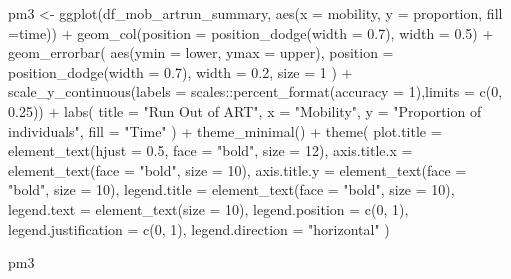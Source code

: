 \documentclass[
  letterpaper,
  DIV=11,
  numbers=noendperiod]{scrartcl}
\newenvironment{Shaded}{\begin{snugshade}}{\end{snugshade}}
\newcommand{\AttributeTok}[1]{\textcolor[rgb]{0.40,0.45,0.13}{#1}}
\newcommand{\DecValTok}[1]{\textcolor[rgb]{0.68,0.00,0.00}{#1}}
\newcommand{\FloatTok}[1]{\textcolor[rgb]{0.68,0.00,0.00}{#1}}
\newcommand{\FunctionTok}[1]{\textcolor[rgb]{0.28,0.35,0.67}{#1}}
\newcommand{\NormalTok}[1]{\textcolor[rgb]{0.00,0.23,0.31}{#1}}
\newcommand{\OtherTok}[1]{\textcolor[rgb]{0.00,0.23,0.31}{#1}}
\newcommand{\SpecialCharTok}[1]{\textcolor[rgb]{0.37,0.37,0.37}{#1}}
\newcommand{\StringTok}[1]{\textcolor[rgb]{0.13,0.47,0.30}{#1}}
\begin{document}
\begin{Shaded}
\begin{Highlighting}[]
\NormalTok{pm3 }\OtherTok{\textless{}{-}} \FunctionTok{ggplot}\NormalTok{(df\_mob\_artrun\_summary, }\FunctionTok{aes}\NormalTok{(}\AttributeTok{x =}\NormalTok{ mobility, }\AttributeTok{y =}\NormalTok{ proportion, }\AttributeTok{fill =}\NormalTok{time)) }\SpecialCharTok{+}
  \FunctionTok{geom\_col}\NormalTok{(}\AttributeTok{position =} \FunctionTok{position\_dodge}\NormalTok{(}\AttributeTok{width =} \FloatTok{0.7}\NormalTok{), }\AttributeTok{width =} \FloatTok{0.5}\NormalTok{) }\SpecialCharTok{+}
  \FunctionTok{geom\_errorbar}\NormalTok{(}
    \FunctionTok{aes}\NormalTok{(}\AttributeTok{ymin =}\NormalTok{ lower, }\AttributeTok{ymax =}\NormalTok{ upper),}
    \AttributeTok{position =} \FunctionTok{position\_dodge}\NormalTok{(}\AttributeTok{width =} \FloatTok{0.7}\NormalTok{),}
    \AttributeTok{width =} \FloatTok{0.2}\NormalTok{,}
    \AttributeTok{size =} \DecValTok{1}
\NormalTok{  ) }\SpecialCharTok{+}
  \FunctionTok{scale\_y\_continuous}\NormalTok{(}\AttributeTok{labels =}\NormalTok{ scales}\SpecialCharTok{::}\FunctionTok{percent\_format}\NormalTok{(}\AttributeTok{accuracy =} \DecValTok{1}\NormalTok{),}\AttributeTok{limits =} \FunctionTok{c}\NormalTok{(}\DecValTok{0}\NormalTok{, }\FloatTok{0.25}\NormalTok{)) }\SpecialCharTok{+}
  \FunctionTok{labs}\NormalTok{(}
    \AttributeTok{title =}  \StringTok{"Run Out of ART"}\NormalTok{,}
    \AttributeTok{x =} \StringTok{"Mobility"}\NormalTok{,}
    \AttributeTok{y =} \StringTok{"Proportion of individuals"}\NormalTok{,}
    \AttributeTok{fill =} \StringTok{"Time"}
\NormalTok{  ) }\SpecialCharTok{+}
  \FunctionTok{theme\_minimal}\NormalTok{() }\SpecialCharTok{+}
  \FunctionTok{theme}\NormalTok{(}
    \AttributeTok{plot.title =}  \FunctionTok{element\_text}\NormalTok{(}\AttributeTok{hjust =} \FloatTok{0.5}\NormalTok{, }\AttributeTok{face =} \StringTok{"bold"}\NormalTok{, }\AttributeTok{size =} \DecValTok{12}\NormalTok{),}
    \AttributeTok{axis.title.x =} \FunctionTok{element\_text}\NormalTok{(}\AttributeTok{face =} \StringTok{"bold"}\NormalTok{, }\AttributeTok{size =} \DecValTok{10}\NormalTok{),}
    \AttributeTok{axis.title.y =} \FunctionTok{element\_text}\NormalTok{(}\AttributeTok{face =} \StringTok{"bold"}\NormalTok{, }\AttributeTok{size =} \DecValTok{10}\NormalTok{),}
    \AttributeTok{legend.title =} \FunctionTok{element\_text}\NormalTok{(}\AttributeTok{face =} \StringTok{"bold"}\NormalTok{, }\AttributeTok{size =} \DecValTok{10}\NormalTok{),}
    \AttributeTok{legend.text =} \FunctionTok{element\_text}\NormalTok{(}\AttributeTok{size =} \DecValTok{10}\NormalTok{),}
    \AttributeTok{legend.position =} \FunctionTok{c}\NormalTok{(}\DecValTok{0}\NormalTok{, }\DecValTok{1}\NormalTok{),}
    \AttributeTok{legend.justification =} \FunctionTok{c}\NormalTok{(}\DecValTok{0}\NormalTok{, }\DecValTok{1}\NormalTok{),}
    \AttributeTok{legend.direction =} \StringTok{"horizontal"}
\NormalTok{  )}

\NormalTok{pm3}
\end{Highlighting}
\end{Shaded}
\end{document}
